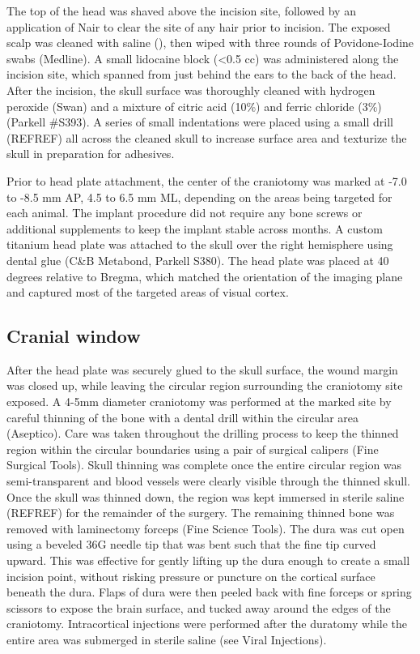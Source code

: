 The top of the head was shaved above the incision site, followed by an application of Nair to clear the site of any hair prior to incision. The exposed scalp was cleaned with saline (), then wiped with three rounds of Povidone-Iodine swabs (Medline). A small lidocaine block (<0.5 cc) was administered along the incision site, which spanned from just behind the ears to the back of the head. After the incision, the skull surface was thoroughly cleaned with hydrogen peroxide (Swan) and a mixture of citric acid (10\%) and ferric chloride (3\%) (Parkell #S393). A series of small indentations were placed using a small drill (REFREF) all across the cleaned skull to increase surface area and texturize the skull in preparation for adhesives. 

Prior to head plate attachment, the center of the craniotomy was marked at -7.0 to -8.5 mm AP, 4.5 to 6.5 mm ML, depending on the areas being targeted for each animal. The implant procedure did not require any bone screws or additional supplements to keep the implant stable across months. A custom titanium head plate was attached to the skull over the right hemisphere using dental glue (C&B Metabond, Parkell S380). The head plate was placed at 40 degrees relative to Bregma, which matched the orientation of the imaging plane and captured most of the targeted areas of visual cortex. 

\subsection{Cranial window}
After the head plate was securely glued to the skull surface, the wound margin was closed up, while leaving the circular region surrounding the craniotomy site exposed. A 4-5mm diameter craniotomy was performed at the marked site by careful thinning of the bone with a dental drill within the circular area (Aseptico). Care was taken throughout the drilling process to keep the thinned region within the circular boundaries using a pair of surgical calipers (Fine Surgical Tools). Skull thinning was complete once the entire circular region was semi-transparent and blood vessels were clearly visible through the thinned skull. Once the skull was thinned down, the region was kept immersed in sterile saline (REFREF) for the remainder of the surgery. The remaining thinned bone was removed with laminectomy forceps (Fine Science Tools). The dura was cut open using a beveled 36G needle tip that was bent such that the fine tip curved upward. This was effective for gently lifting up the dura enough to create a small incision point, without risking pressure or puncture on the cortical surface beneath the dura. Flaps of dura were then peeled back with fine forceps or spring scissors to expose the brain surface, and tucked away around the edges of the craniotomy. Intracortical injections were performed after the duratomy while the entire area was submerged in sterile saline (see Viral Injections).

